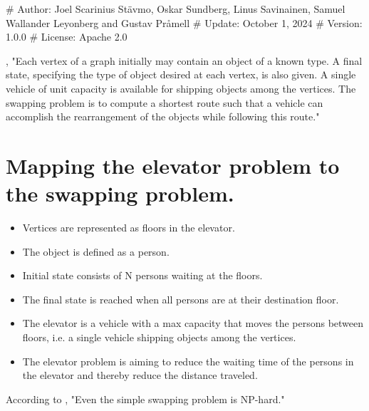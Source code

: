 # Author: Joel Scarinius Stävmo, Oskar Sundberg, Linus Savinainen, Samuel Wallander Leyonberg  and Gustav Pråmell
# Update: October 1, 2024
# Version: 1.0.0
# License: Apache 2.0


\cite{anily1992swapping}, "Each vertex of a graph initially may contain an object of a known type. A final state, specifying the type of object desired at each vertex, is also given. A single vehicle of unit capacity is available for shipping objects among the vertices. The swapping problem is to compute a shortest route such that a vehicle can accomplish the rearrangement of the objects while following this route."
\section*{Mapping the elevator problem to the swapping problem.}
\begin{itemize}
	\item Vertices are represented as floors in the elevator.
	\item The object is defined as a person.
	\item Initial state consists of N persons waiting at the floors.
	\item The final state is reached when all persons are at their destination floor.
	\item The elevator is a vehicle with a max capacity that moves the persons between floors, i.e. a single vehicle shipping objects among the vertices.
	\item The elevator problem is aiming to reduce the waiting time of the persons in the elevator and thereby reduce the distance traveled.
\end{itemize}

According to \cite{anily1992swapping},  "Even the simple swapping problem is NP-hard."
